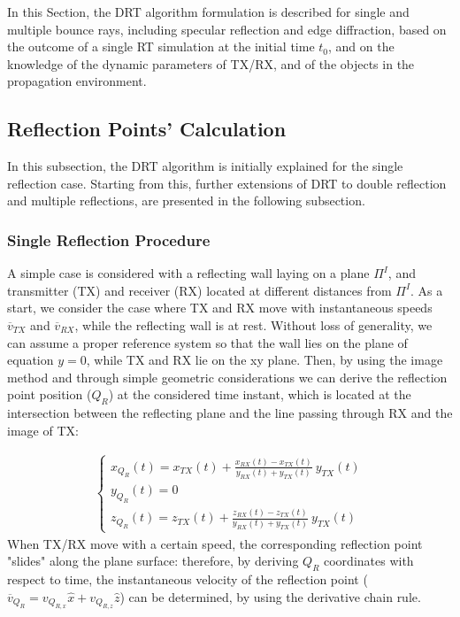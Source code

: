In this Section, the DRT algorithm formulation is described for single and multiple bounce rays, including specular reflection and edge diffraction, based on the outcome of a single RT simulation at the initial time $t_0$, and on the knowledge of the dynamic parameters of TX/RX, and of the objects in the propagation environment. \par 


\subsection{Reflection Points' Calculation}
In this subsection, the DRT algorithm is initially explained for the single reflection case. Starting from this, further extensions of DRT to double reflection and multiple reflections, are presented in the following subsection. 

\subsubsection{Single Reflection Procedure}
A simple case is considered with a reflecting wall laying on a plane $\Pi^I$, and transmitter (TX) and receiver (RX) located at different distances from $\Pi^I$. As a start, we consider the case where TX and RX move with instantaneous speeds $\overline{v}_{TX}$ and $\overline{v}_{RX}$, while the reflecting wall is at rest. Without loss of generality, we can assume a proper reference system so that the wall lies on the plane of equation $y=0$, while TX and RX lie on the xy plane. Then, by using the image method and through simple geometric considerations we can derive the reflection point position ($Q_R$) at the considered time instant, which is located at the intersection between the reflecting plane and the line passing through RX and the image of TX:

\begin{equation}
\begin{gathered}
\begin{cases}
x_{Q_{R}}(t) = x_{TX}(t) + \frac{x_{RX}(t)-x_{TX}(t)}{y_{RX}(t)+y_{TX}(t)}~y_{TX}(t) \\
y_{Q_{R}}(t) = 0 \\
z_{Q_{R}}(t) = z_{TX}(t) + \frac{z_{RX}(t)-z_{TX}(t)}{y_{RX}(t)+y_{TX}(t)}~y_{TX}(t)
\end{cases}
\end{gathered}
\label{ref_point}
\end{equation}
When TX/RX move with a certain speed, the corresponding reflection point "slides" along the plane surface: therefore, by deriving $Q_R$ coordinates with respect to time, the instantaneous velocity of the reflection point ($\overline{v}_{Q_{R}}=v_{Q_{R,x}}\hat{x}+v_{Q_{R,z}}\hat{z}$) can be determined, by using the derivative chain rule. 

